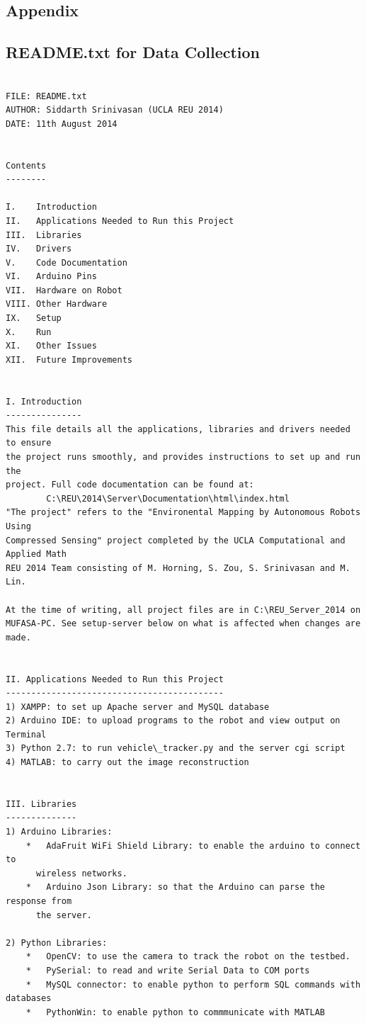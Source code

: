 \documentclass[english]{article}\usepackage[]{graphicx}\usepackage[]{color}
\begin{document}
\newpage
\begin{appendix}

\section{Appendix}
\subsection{README.txt for Data Collection}

\begin{verbatim}

FILE: README.txt
AUTHOR: Siddarth Srinivasan (UCLA REU 2014)
DATE: 11th August 2014


Contents
--------

I.    Introduction
II.   Applications Needed to Run this Project
III.  Libraries
IV.   Drivers
V.    Code Documentation
VI.   Arduino Pins
VII.  Hardware on Robot
VIII. Other Hardware
IX.   Setup
X.    Run
XI.   Other Issues
XII.  Future Improvements


I. Introduction
---------------
This file details all the applications, libraries and drivers needed to ensure
the project runs smoothly, and provides instructions to set up and run the
project. Full code documentation can be found at:
		C:\REU\2014\Server\Documentation\html\index.html
"The project" refers to the "Environental Mapping by Autonomous Robots Using
Compressed Sensing" project completed by the UCLA Computational and Applied Math
REU 2014 Team consisting of M. Horning, S. Zou, S. Srinivasan and M. Lin.

At the time of writing, all project files are in C:\REU_Server_2014 on
MUFASA-PC. See setup-server below on what is affected when changes are made.


II. Applications Needed to Run this Project
-------------------------------------------
1) XAMPP: to set up Apache server and MySQL database
2) Arduino IDE: to upload programs to the robot and view output on Terminal
3) Python 2.7: to run vehicle\_tracker.py and the server cgi script
4) MATLAB: to carry out the image reconstruction


III. Libraries
--------------
1) Arduino Libraries:
	*   AdaFruit WiFi Shield Library: to enable the arduino to connect to
	  wireless networks.
	*   Arduino Json Library: so that the Arduino can parse the response from
	  the server.

2) Python Libraries:
	*   OpenCV: to use the camera to track the robot on the testbed.
	*   PySerial: to read and write Serial Data to COM ports
	*   MySQL connector: to enable python to perform SQL commands with databases
	*   PythonWin: to enable python to commmunicate with MATLAB



\end{verbatim}
\end{appendix}
\end{document}

